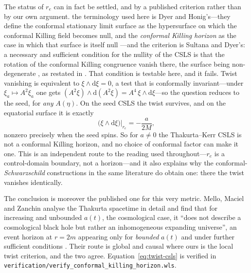 \documentclass[12pt]{iopart}
\theoremstyle{plain}
\theoremstyle{definition}
\theoremstyle{remark}
\newcommand{\re}{r_{e}}
\newcommand{\dd}{\mathrm{d}}
\begin{document}
The status of $\re$ can in fact be settled, and by a published criterion rather
than by our own argument. the terminology used here is Dyer and
Honig's---they define the conformal stationary limit surface as the hypersurface on
which the conformal Killing field becomes null, and the \emph{conformal Killing
horizon} as the case in which that surface is itself null
\cite{DyerHonig1979}---and the criterion is Sultana and Dyer's: a necessary and
sufficient condition for the nullity of the CSLS is that the rotation of the
conformal Killing congruence vanish there, the surface being non-degenerate
\cite{SultanaDyer2004}, as restated in \cite[\S1]{SultanaDyer2005}. That condition is testable here, and it fails. Twist
vanishing is equivalent to $\xi\wedge\dd\xi=0$, a test that is conformally
invariant---under $\xi_a\mapsto A^2\xi_a$ one gets
$(A^2\xi)\wedge\dd(A^2\xi)=A^4\,\xi\wedge\dd\xi$---so the question reduces to the
seed, for \emph{any} $A(\eta)$. On the seed CSLS the twist survives, and on the
equatorial surface it is exactly
\begin{equation}
    \big(\xi\wedge\dd\xi\big)\big|_{\re}=-\frac{a}{2M} ,
    \label{eq:twist-csls}
\end{equation}
nonzero precisely when the seed spins. So for $a\neq0$ the Thakurta--Kerr CSLS is
not a conformal Killing horizon, and no choice of conformal factor can make it one.
This is an independent route to the reading used throughout---$\re$ is a
control-domain boundary, not a horizon---and it also explains why the
conformal-\emph{Schwarzschild} constructions in the same literature
\cite{SultanaDyer2005} do obtain one: there the twist vanishes identically.

The conclusion is moreover the published one for this very metric. Mello, Maciel
and Zanchin analyse the Thakurta spacetime in detail and find that for increasing
and unbounded $a(t)$, the cosmological case, it ``does not describe a cosmological
black hole but rather an inhomogeneous expanding universe'', an event horizon at
$r=2m$ appearing only for \emph{bounded} $a(t)$ and under further sufficient
conditions \cite[abstract, \S I]{MelloMaciel2017}. Their route is global and causal
where ours is the local twist criterion, and the two agree.
Equation~\eqref{eq:twist-csls} is verified in
\texttt{verification/verify\_conformal\_killing\_horizon.wls}.
\end{document}
